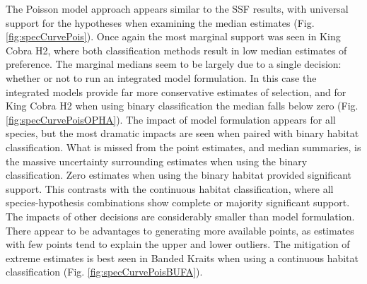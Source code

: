 \documentclass[10pt,a4paper]{article}
\begin{document}
The Poisson model approach appears similar to the SSF results, with universal support for the hypotheses when examining the median estimates (Fig. \ref{fig:specCurvePois}).
Once again the most marginal support was seen in King Cobra H2, where both classification methods result in low median estimates of preference.
The marginal medians seem to be largely due to a single decision: whether or not to run an integrated model formulation.
In this case the integrated models provide far more conservative estimates of selection, and for King Cobra H2 when using binary classification the median falls below zero (Fig. \ref{fig:specCurvePoisOPHA}).
The impact of model formulation appears for all species, but the most dramatic impacts are seen when paired with binary habitat classification.
What is missed from the point estimates, and median summaries, is the massive uncertainty surrounding estimates when using the binary classification.
Zero estimates when using the binary habitat provided significant support.
This contrasts with the continuous habitat classification, where all species-hypothesis combinations show complete or majority significant support.
The impacts of other decisions are considerably smaller than model formulation.
There appear to be advantages to generating more available points, as estimates with few points tend to explain the upper and lower outliers.
The mitigation of extreme estimates is best seen in Banded Kraits when using a continuous habitat classification (Fig. \ref{fig:specCurvePoisBUFA}).
\end{document}
